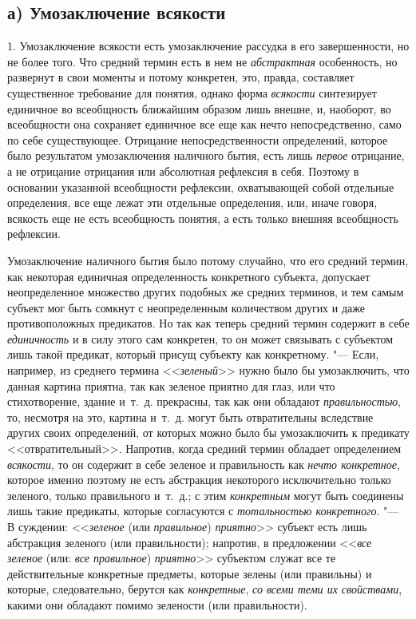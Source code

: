 \subsection[а) Умозаключение всякости]{а) Умозаключение всякости}
1. Умозаключение всякости есть умозаключение рассудка в его
завершенности, но не более того. Что средний термин есть в нем не
{\em абстрактная}
особенность, но развернут в свои моменты и потому конкретен,
это, правда, составляет существенное требование для понятия, однако форма
{\em всякости}
синтезирует единичное во всеобщность ближайшим образом лишь
внешне, и, наоборот, во всеобщности она сохраняет единичное все еще как
нечто непосредственно, само по себе существующее. Отрицание
непосредственности определений, которое было результатом умозаключения
наличного бытия, есть лишь {\em первое}
отрицание, а не отрицание отрицания или абсолютная рефлексия
в себя. Поэтому в основании указанной всеобщности рефлексии, охватывающей
собой отдельные определения, все еще лежат эти отдельные определения, или,
иначе говоря, всякость еще не есть всеобщность понятия, а есть только
внешняя всеобщность рефлексии.

Умозаключение наличного бытия было потому случайно, что его
средний термин, как некоторая единичная определенность конкретного
субъекта, допускает неопределенное множество других подобных же средних
терминов, и тем самым субъект мог быть сомкнут с неопределенным количеством
других и даже противоположных предикатов. Но так как теперь средний термин
содержит в себе {\em единичность}
и в силу этого сам конкретен, то он может связывать с
субъектом лишь такой предикат, который присущ субъекту как конкретному. "---
Если, например, из среднего термина
<<{\em зеленый}>> нужно
было бы умозаключить, что данная картина приятна, так как зеленое приятно
для глаз, или что стихотворение, здание и~т.~д. прекрасны, так как они
обладают {\em правильностью},
то, несмотря на это, картина и~т.~д. могут быть отвратительны
вследствие других своих определений, от которых можно было бы умозаключить
к предикату <<отвратительный>>. Напротив, когда средний термин обладает
определением {\em всякости},
то он содержит в себе зеленое и правильность как
{\em нечто конкретное},
которое именно поэтому не есть абстракция некоторого
исключительно только зеленого, только правильного и~т.~д.; с этим
{\em конкретным} могут
быть соединены лишь такие предикаты, которые согласуются с
{\em тотальностью конкретного}. "---
В суждении:
<<{\em зеленое} (или
{\em правильное})
{\em приятно}>> субъект
есть лишь абстракция зеленого (или правильности); напротив, в предложении
<<{\em все зеленое} (или:
{\em все правильное})
{\em приятно}>> субъектом
служат все те действительные конкретные предметы, которые зелены (или
правильны) и которые, следовательно, берутся как
{\em конкретные},
{\em со всеми теми их свойствами},
какими они обладают помимо зелености (или правильности).


